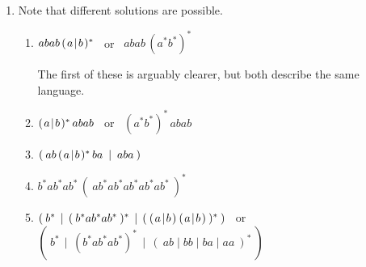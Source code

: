 \documentclass[11pt]{article}
\begin{document}
\begin{enumerate}
\begin{enumerate}
          \end{enumerate}

    \item Note that different solutions are possible.

          \newcommand{\sss}{\hspace{.35mm}}
          \newcommand{\mymid}{\mbox{\ensuremath{\sss\mid\sss}}}
          \newcommand{\common}{\ensuremath{( \sss a \mymid b \sss)}}

          \vspace{-1.5mm}

          \begin{enumerate}

            \addtolength{\itemsep}{2mm}

            \item \(
                    abab \, \common^{*}
                  \)
                  ~or~
                  \(
                    abab \, (a^{*}b^{*})^*
                  \)

                  \smallskip

                  The first of these is arguably clearer, but both describe
                  the same language.

            \item \(
                    \common^{*} \, abab
                  \)
                  ~or~
                  \(
                    (a^{*}b^{*})^{*} \, abab
                  \)

            \item \(
                    ( \: ab \, \common^{*} \, ba \: \mid \: aba \: )
                  \)

            \item \(
                    b^*ab^*ab^* \, (\: ab^*ab^*ab^*ab^*ab^* \: )^*
                  \)

            \item \(
                    ( \:
                      b^{*}
                      \, \mid \,
                      ( \: b^{*}ab^{*}ab^{*} \: )^{*}
                      \, \mid \, 
                      ( \: \common \: \common \: )^{*} \:
                    )
                  \)
                  ~or~
                  \(
                    ( \:
                      b^{*}
                       \, \mid \,
                      ( b^{*}ab^{*}ab^{*} )^{*}
                       \, \mid \,
                      ( \: ab \mid bb \mid ba \mid aa \: )^{*}  \:
                    )
                  \)


\end{enumerate}
\end{enumerate}
\end{document}
